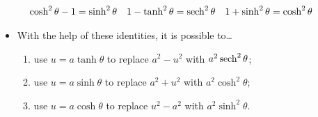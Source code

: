 \documentclass[../main.tex]{subfiles}
\begin{document}
\begin{itemize}
    \begin{align*}
        \cosh^2\theta-1 &= \sinh^2\theta&
        1-\tanh^2\theta &= \sech^2\theta&
        1+\sinh^2\theta &= \cosh^2\theta
    \end{align*}
    \begin{itemize}
        \item With the help of these identities, it is possible to\dots
        \begin{enumerate}
            \item use $u=a\tanh\theta$ to replace $a^2-u^2$ with $a^2\sech^2\theta$;
            \item use $u=a\sinh\theta$ to replace $a^2+u^2$ with $a^2\cosh^2\theta$;
            \item use $u=a\cosh\theta$ to replace $u^2-a^2$ with $a^2\sinh^2\theta$.
        \end{enumerate}
    \end{itemize}
\end{itemize}
\end{document}
